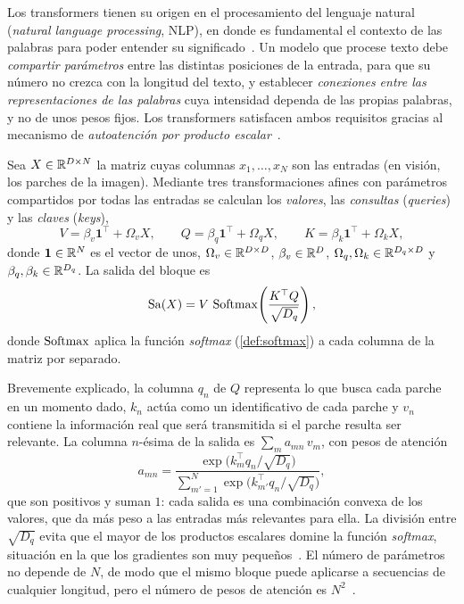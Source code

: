 Los transformers tienen su origen en el procesamiento del lenguaje natural (\emph{natural language processing}, NLP), en donde es fundamental el contexto
de las palabras para poder entender su significado~\cite[sec.~12.1]{prince2023understanding}.
Un modelo que procese texto debe \emph{compartir parámetros} entre las distintas posiciones de la entrada, para que su número no crezca con la longitud
del texto, y establecer \emph{conexiones entre las representaciones de las palabras} cuya intensidad dependa de las propias palabras, y no de unos pesos fijos.
Los transformers satisfacen ambos requisitos gracias al mecanismo de \emph{autoatención por producto escalar}~\cite[sec.~12.2]{prince2023understanding}.

\begin{definicion}\label{def:autoatencion}
Sea $X\in\mathbb{R}^{D\times N}$ la matriz cuyas columnas $x_1,\dots,x_N$ son las entradas
(en visión, los parches de la imagen). Mediante tres transformaciones afines con
parámetros compartidos por todas las entradas se calculan los \emph{valores}, las
\emph{consultas} (\emph{queries}) y las \emph{claves} (\emph{keys}),
\[
  V = \beta_v\mathbf{1}^{\top} + \Omega_v X, \qquad
  Q = \beta_q\mathbf{1}^{\top} + \Omega_q X, \qquad
  K = \beta_k\mathbf{1}^{\top} + \Omega_k X,
\]
donde $\mathbf{1}\in\mathbb{R}^{N}$ es el vector de unos, $\Omega_v\in\mathbb{R}^{D\times D}$,
$\beta_v\in\mathbb{R}^D$, $\Omega_q,\Omega_k\in\mathbb{R}^{D_q\times D}$ y
$\beta_q,\beta_k\in\mathbb{R}^{D_q}$. La salida del bloque es
\[
  \operatorname{Sa}(X) = V\,\operatorname{Softmax}\!\left(\frac{K^{\top}Q}{\sqrt{D_q}}\right),
\]
donde $\operatorname{Softmax}$ aplica la función \emph{softmax} (\cref{def:softmax}) a cada
columna de la matriz por separado.
\end{definicion}

Brevemente explicado, la columna $q_n$ de $Q$ representa lo que busca cada parche en un momento dado, $k_n$ actúa como un identificativo
de cada parche y $v_n$ contiene la información real que será transmitida si el parche resulta ser relevante. La columna $n$-ésima de la salida es
$\sum_{m} a_{mn}\,v_m$, con pesos de atención
\[
  a_{mn} = \frac{\exp\bigl(k_m^{\top} q_n/\sqrt{D_q}\bigr)}{\sum_{m'=1}^{N}\exp\bigl(k_{m'}^{\top} q_n/\sqrt{D_q}\bigr)},
\]
que son positivos y suman $1$: cada salida es una combinación convexa de los valores, que da más peso a las entradas más relevantes para ella.
La división entre $\sqrt{D_q}$ evita que el mayor de los productos escalares domine la función \emph{softmax},
situación en la que los gradientes son muy pequeños~\cite[sec.~12.3.2]{prince2023understanding}. El número de parámetros no depende de $N$, de modo
que el mismo bloque puede aplicarse a secuencias de cualquier longitud, pero el número de pesos de atención es $N^2$~\cite[sec.~12.2]{prince2023understanding}.

